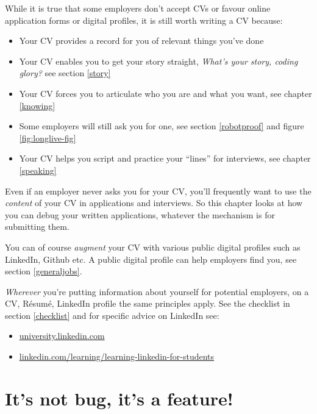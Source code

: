 \documentclass[
]{book}
\providecommand{\tightlist}{%
  \setlength{\itemsep}{0pt}\setlength{\parskip}{0pt}}
\begin{document}
While it is true that some employers don't accept CVs or favour online application forms or digital profiles, it is still worth writing a CV because:

\begin{itemize}
\tightlist
\item
  Your CV provides a record for you of relevant things you've done
\item
  Your CV enables you to get your story straight, \emph{What's your story, coding glory?} see section \ref{story} \citep{whatsthestory}
\item
  Your CV forces you to articulate who you are and what you want, see chapter \ref{knowing}
\item
  Some employers will still ask you for one, see section \ref{robotproof} and figure \ref{fig:longlive-fig}
\item
  Your CV helps you script and practice your ``lines'' for interviews, see chapter \ref{speaking}
\end{itemize}

Even if an employer never asks you for your CV, you'll frequently want to use the \emph{content} of your CV in applications and interviews. So this chapter looks at how you can debug your written applications, whatever the mechanism is for submitting them.

You can of course \emph{augment} your CV with various public digital profiles such as LinkedIn, Github etc. A public digital profile can help employers find you, see section \ref{generaljobs}.

\emph{Wherever} you're putting information about yourself for potential employers, on a CV, Résumé, LinkedIn profile the same principles apply. See the checklist in section \ref{checklist} and for specific advice on LinkedIn see:

\begin{itemize}
\tightlist
\item
  \href{https://university.linkedin.com/}{university.linkedin.com}
\item
  \href{https://linkedin.com/learning/learning-linkedin-for-students}{linkedin.com/learning/learning-linkedin-for-students}
\end{itemize}

\hypertarget{trope}{%
\section{It's not bug, it's a feature!}\label{trope}}
\end{document}

